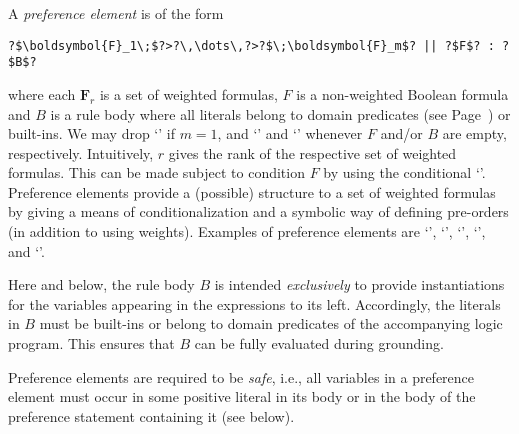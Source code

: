 A \emph{preference element} is of the form
\begin{lstlisting}[numbers=none,escapechar=?]
?$\boldsymbol{F}_1\;$?>?\,\dots\,?>?$\;\boldsymbol{F}_m$? || ?$F$? : ?$B$?
\end{lstlisting}
where each $\boldsymbol{F}_r$ is a set of weighted formulas, 
$F$ is a non-weighted Boolean formula
and $B$ is a rule body where all literals belong to domain predicates
(see Page~\pageref{pg:domain}) or built-ins.
%
We may drop `\code{>}' if $m=1$, 
and `' and `' whenever $F$ and/or $B$ are empty, respectively.
%
Intuitively, $r$ gives the rank of the respective set of weighted formulas.
This can be made subject to condition $F$ by using the conditional `\code{||}'.
Preference elements provide a (possible) structure to a set of weighted formulas
by giving a means of conditionalization and a symbolic way of defining pre-orders (in addition to using weights).
%
%
Examples of preference elements are 
`', 
`',  
`', 
`',  and
`'.

\begin{note}
Here and below, 
the rule body $B$ is intended \emph{exclusively} to provide instantiations for the variables appearing in the expressions to its left.  
Accordingly, the literals in $B$ must be built-ins or belong to domain predicates of the accompanying logic program.
This ensures that $B$ can be fully evaluated during grounding.
\end{note}

\begin{note}
Preference elements are required to be \emph{safe}, 
i.e., all variables in a preference element must occur in some positive literal 
in its body or in the body of the preference statement containing it (see below).  
\end{note} 

